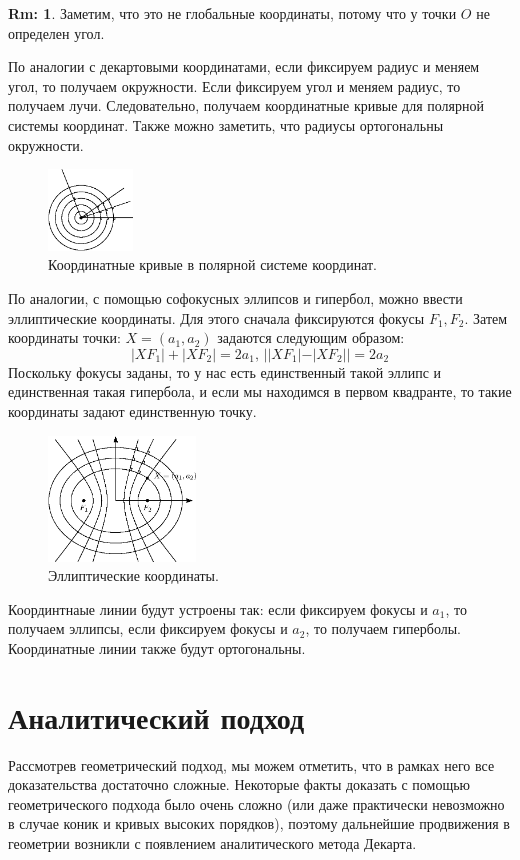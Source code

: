 \documentclass[12pt]{article}
\theoremstyle{definition}
\newtheorem{rem}{Rm:}
\begin{document}
\begin{rem}
	Заметим, что это не глобальные координаты, потому что у точки $O$ не определен угол.
\end{rem}
По аналогии с декартовыми координатами, если фиксируем радиус и меняем угол, то получаем окружности. Если фиксируем угол и меняем радиус, то получаем лучи. Следовательно, получаем координатные кривые для полярной системы координат. Также можно заметить, что радиусы ортогональны окружности.
\begin{figure}[H]
	\centering
	\includegraphics[width=0.2\textwidth]{ANGL2_22.eps}
	\caption{Координатные кривые в полярной системе координат.}
	\label{2_22}
\end{figure}

По аналогии, с помощью софокусных эллипсов и гипербол, можно ввести эллиптические координаты. Для этого сначала фиксируются фокусы $F_1, F_2$. Затем координаты точки: $X = (a_1, a_2)$ задаются следующим образом:
$$
	|XF_1| + |XF_2| = 2a_1, \, ||XF_1| - |XF_2|| = 2a_2
$$
Поскольку фокусы заданы, то у нас есть единственный такой эллипс и единственная такая гипербола, и если мы находимся в первом квадранте, то такие координаты задают единственную точку.
\begin{figure}[H]
	\centering
	\includegraphics[width=0.35\textwidth]{ANGL2_23.eps}
	\caption{Эллиптические координаты.}
	\label{2_23}
\end{figure}
Координтнаые линии будут устроены так: если фиксируем фокусы и $a_1$, то получаем эллипсы, если фиксируем фокусы и $a_2$, то получаем гиперболы. Координатные линии также будут ортогональны.

\newpage
\section*{Аналитический подход}
Рассмотрев геометрический подход, мы можем отметить, что в рамках него все доказательства достаточно сложные. Некоторые факты доказать с помощью геометрического подхода было очень сложно (или даже практически невозможно в случае коник и кривых высоких порядков), поэтому дальнейшие продвижения в геометрии возникли с появлением аналитического метода Декарта.
\end{document}
